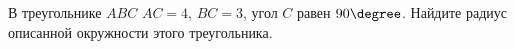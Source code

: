 \begin{ex}
	\begin{condition}
		В треугольнике \( ABC  \) \( AC=4 \), \( BC=3 \), угол \( C \) равен \( 90\degree\). Найдите радиус описанной окружности этого треугольника.
	\end{condition}
\end{ex}